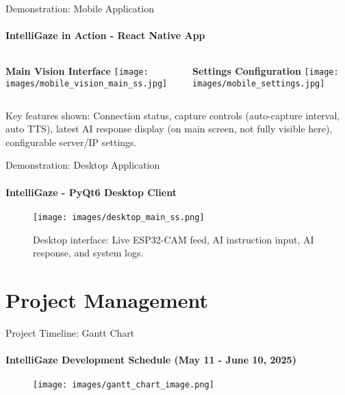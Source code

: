\documentclass[10pt]{beamer}
\begin{document}
\begin{frame}{Demonstration: Mobile Application}
    \framesubtitle{IntelliGaze in Action - React Native App}
    \begin{columns}[T]
        \begin{column}{0.48\textwidth} %
            \centering
            \textbf{Main Vision Interface}
            \texttt{[image: images/mobile\_vision\_main\_ss.jpg]} %
        \end{column}
        \begin{column}{0.48\textwidth} %
            \centering
            \textbf{Settings Configuration}
            \texttt{[image: images/mobile\_settings.jpg]} %
        \end{column}
    \end{columns}
    \vspace{0.5em}
    \footnotesize Key features shown: Connection status, capture controls (auto-capture interval, auto TTS), latest AI response display (on main screen, not fully visible here), configurable server/IP settings.
\end{frame}

\begin{frame}{Demonstration: Desktop Application}
    \framesubtitle{IntelliGaze - PyQt6 Desktop Client}
    \begin{figure}
        \centering
        \texttt{[image: images/desktop\_main\_ss.png]}
        \caption{Desktop interface: Live ESP32-CAM feed, AI instruction input, AI response, and system logs.}
    \end{figure}
\end{frame}

\section{Project Management}

\begin{frame}{Project Timeline: Gantt Chart}
    \framesubtitle{IntelliGaze Development Schedule (May 11 - June 10, 2025)}
    \begin{figure}
        \centering
        \texttt{[image: images/gantt\_chart\_image.png]}
    \end{figure}
\end{frame}
\end{document}
